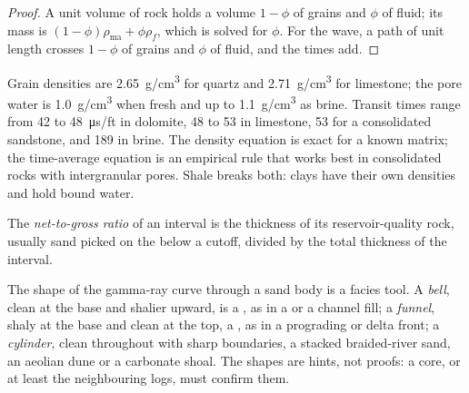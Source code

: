 \begin{proof}
A unit volume of rock holds a volume $1 - \phi$ of grains and $\phi$ of
fluid; its mass is $(1 - \phi)\rho_{\mathrm{ma}} + \phi\rho_f$, which is
solved for $\phi$. For the wave, a path of unit length crosses $1 - \phi$ of
grains and $\phi$ of fluid, and the times add.
\end{proof}

Grain densities are \qty{2.65}{g/cm^3} for quartz and \qty{2.71}{g/cm^3} for
limestone; the pore water is \qty{1.0}{g/cm^3} when fresh and up to
\qty{1.1}{g/cm^3} as brine. Transit times range from 42 to
\qty{48}{\micro\second/ft} in dolomite, 48 to 53 in limestone, 53 for a
consolidated sandstone, and 189 in brine. The density equation is exact for
a known matrix; the time-average equation is an empirical rule that works
best in consolidated rocks with intergranular pores. Shale breaks both:
clays have their own densities and hold bound water.

\begin{definition}\label{def:b3:facies-models:ntg}
The \emph{net-to-gross ratio} of an interval is the
thickness of its reservoir-quality rock, usually sand picked on the  below a cutoff, divided by the total thickness of the interval.
\end{definition}

The shape of the gamma-ray curve through a sand body is a facies tool.
A \emph{bell}, clean at the base and shalier upward, is a , as in a  or a channel fill; a \emph{funnel}, shaly at
the base and clean at the top, a , as in a
prograding  or delta front; a \emph{cylinder}, clean throughout with
sharp boundaries, a stacked braided-river sand, an aeolian dune or a
carbonate shoal. The shapes are hints, not proofs: a core, or at least the
neighbouring logs, must confirm them.

